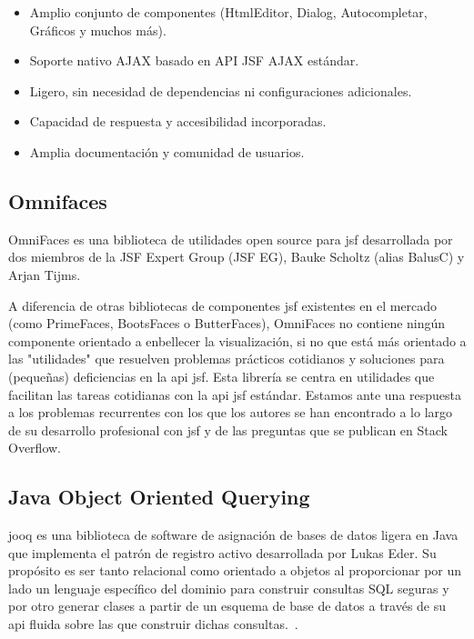 \begin{itemize}
\item Amplio conjunto de componentes (HtmlEditor, Dialog, Autocompletar, Gráficos y muchos más).
\item Soporte nativo AJAX basado en API JSF AJAX estándar. 
\item Ligero, sin necesidad de dependencias ni configuraciones adicionales. 
\item Capacidad de respuesta y accesibilidad incorporadas. 
\item Amplia documentación y comunidad de usuarios.
\end{itemize}


\subsection{Omnifaces}
\label{sec:omnifaces}

OmniFaces es una biblioteca de utilidades open source para \acrshort{jsf} desarrollada por dos miembros de la JSF Expert Group (JSF EG), Bauke Scholtz (alias BalusC) y Arjan Tijms\cite{WikiOmnifaces}.

A diferencia de otras bibliotecas de componentes \acrshort{jsf}  existentes en el mercado (como PrimeFaces, BootsFaces o ButterFaces), OmniFaces no contiene ningún componente orientado a enbellecer la visualización, si no que está más orientado a las "utilidades" que resuelven problemas prácticos cotidianos y soluciones para (pequeñas) deficiencias en la \acrshort{api}  \acrshort{jsf}. Esta librería se centra en utilidades que facilitan las tareas cotidianas con la \acrshort{api} \acrshort{jsf} estándar. Estamos ante una respuesta a los problemas recurrentes con los que los autores se han encontrado a lo largo de su desarrollo profesional con \acrshort{jsf} y de las preguntas que se publican en Stack Overflow.

\subsection{Java Object Oriented Querying}
\label{sec:jooq}
\acrfull{jooq} es una biblioteca de software de asignación de bases de datos ligera en Java que implementa el patrón de registro activo desarrollada por Lukas Eder. Su propósito es ser tanto relacional como orientado a objetos al proporcionar por un lado un lenguaje específico del dominio para construir consultas SQL seguras y por otro generar clases a partir de un esquema de base de datos a través de su \acrshort{api} fluida sobre las que construir dichas consultas.~\cite{jooqBaeldung, WikiJooq}.

